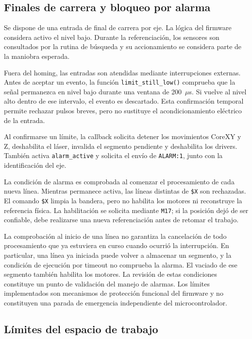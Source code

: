 \documentclass[blue,fullpaper]{ludusofficial}  %
\begin{document}
\subsection{Finales de carrera y bloqueo por alarma}

Se dispone de una entrada de final de carrera por eje.
La lógica del firmware considera activo el nivel bajo.
Durante la referenciación, los sensores son consultados
por la rutina de búsqueda y su accionamiento se considera
parte de la maniobra esperada.

Fuera del homing, las entradas son atendidas mediante
interrupciones externas. Antes de aceptar un evento,
la función \texttt{limit\_still\_low()} comprueba que
la señal permanezca en nivel bajo durante una ventana
de 200~$\mu$s. Si vuelve al nivel alto dentro de ese
intervalo, el evento es descartado. Esta confirmación
temporal permite rechazar pulsos breves, pero no sustituye
el acondicionamiento eléctrico de la entrada.

Al confirmarse un límite, la callback solicita detener
los movimientos CoreXY y Z, deshabilita el láser,
invalida el segmento pendiente y deshabilita los drivers.
También activa \texttt{alarm\_active} y solicita el envío
de \texttt{ALARM:1}, junto con la identificación del eje.

La condición de alarma es comprobada al comenzar
el procesamiento de cada nueva línea. Mientras permanece
activa, las líneas distintas de \texttt{\$X} son rechazadas.
El comando \texttt{\$X} limpia la bandera, pero no habilita
los motores ni reconstruye la referencia física.
La habilitación se solicita mediante \texttt{M17};
si la posición dejó de ser confiable, debe realizarse
una nueva referenciación antes de retomar el trabajo.

La comprobación al inicio de una línea no garantiza
la cancelación de todo procesamiento que ya estuviera
en curso cuando ocurrió la interrupción. En particular, una línea ya iniciada puede volver a almacenar un segmento, y la condición de ejecución por timeout no comprueba la alarma. El vaciado de ese segmento también habilita los motores. La revisión de estas condiciones constituye un punto de validación del manejo de alarmas. Los límites
implementados son mecanismos de protección funcional
del firmware y no constituyen una parada de emergencia
independiente del microcontrolador.

\subsection{Límites del espacio de trabajo}
\end{document}
